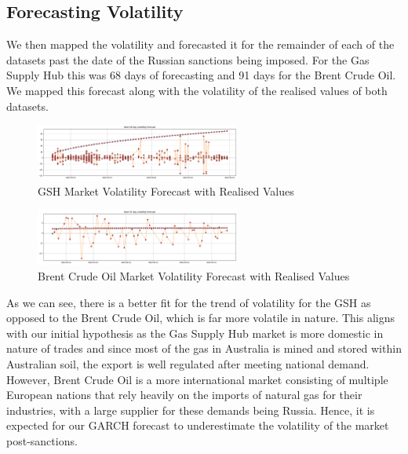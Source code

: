 \subsection{Forecasting Volatility}
We then mapped the volatility and forecasted it for the remainder of each of the datasets past the date of the Russian sanctions being imposed. For the Gas Supply Hub this was 68 days of forecasting and 91 days for the Brent Crude Oil. We mapped this forecast along with the volatility of the realised values of both datasets.
\begin{figure}[H]
    \centering
    \includegraphics[width=0.6\textwidth]{Figures/Garch/gas_forecast.png}
    \caption{GSH Market Volatility Forecast with Realised Values}
    \label{fig:Results_table}
\end{figure}
\begin{figure}[H]
    \centering
    \includegraphics[width=0.6\textwidth]{Figures/Garch/crude_forecast.png}
    \caption{Brent Crude Oil Market Volatility Forecast with Realised Values}
    \label{fig:Results_table}
\end{figure}

As we can see,  there is a better fit for the trend of volatility for the GSH as opposed to the Brent Crude Oil, which is far more volatile in nature. This aligns with our initial hypothesis as the Gas Supply Hub market is more domestic in nature of trades and since most of the gas in Australia is mined and stored within Australian soil, the export is well regulated after meeting national demand. However, Brent Crude Oil is a more international market consisting of multiple European nations that rely heavily on the imports of natural gas for their industries, with a large supplier for these demands being Russia. Hence, it is expected for our GARCH forecast to underestimate the volatility of the market post-sanctions. 